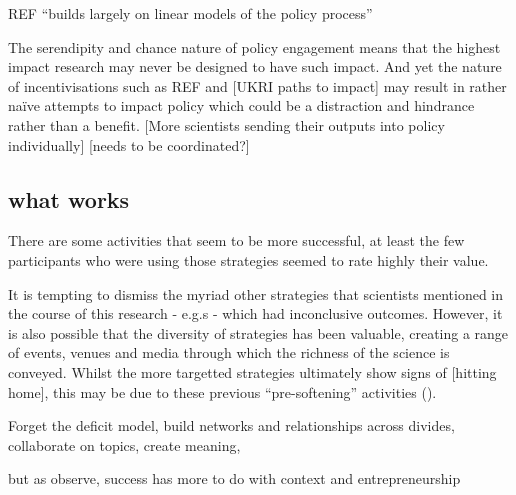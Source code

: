 REF ``builds largely on linear models of the policy process'' \cite{CairneyO2020}

The serendipity and chance nature of policy engagement means that the highest impact research may never be designed to have such impact. And yet the nature of incentivisations such as REF and [UKRI paths to impact] may result in rather na\"ive attempts to impact policy which could be a distraction and hindrance rather than a benefit. [More scientists sending their outputs into policy individually] [needs to be coordinated?]

\subsection{what works}
There are some activities that seem to be more successful, at least the few participants who were using those strategies seemed to rate highly their value. 

It is tempting to dismiss the myriad other strategies that scientists mentioned in the course of this research - e.g.s - which had inconclusive outcomes. However, it is also possible that the diversity of strategies has been valuable, creating a range of events, venues and media through which the richness of the science is conveyed. Whilst the more targetted strategies ultimately show signs of [hitting home], this may be due to these previous ``pre-softening'' activities (\cite{Cairney2018}).

Forget the deficit model, build networks and relationships across divides, collaborate on topics, create meaning, 

but as \textcite{CairneyO2020} observe, success has more to do with context and entrepreneurship

